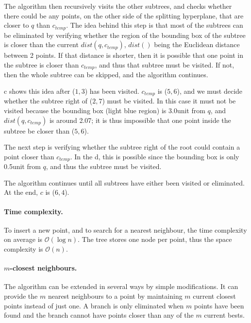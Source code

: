 The algorithm then recursively visits the other subtrees, and checks whether there could be any points, on the other side of the splitting hyperplane, that are closer to $q$ than $c_{temp}$.
The idea behind this step is that most of the subtrees can be eliminated by verifying whether the region of the bounding box of the subtree is closer than the current $dist(q, c_{temp})$, $dist()$ being the Euclidean distance between 2 points.
If that distance is shorter, then it is possible that one point in the subtree is closer than $c_{temp}$, and thus that subtree must be visited. 
If not, then the whole subtree can be skipped, and the algorithm continues.

c shows this idea after ($1,3$) has been visited.
$c_{temp}$ is ($5,6$), and we must decide whether the subtree right of ($2,7$) must be visited.
In this case it must not be visited because the bounding box (light blue region) is 3.0unit from $q$, and $dist(q,c_{temp})$ is around 2.07; it is thus impossible that one point inside the subtree be closer than ($5,6$).

The next step is verifying whether the subtree right of the root could contain a point closer than $c_{temp}$.
In the d, this is possible since the bounding box is only 0.5unit from $q$, and thus the subtree must be visited.

The algorithm continues until all subtrees have either been visited or eliminated.
At the end, $c$ is ($6,4$).


\paragraph{Time complexity.}
To insert a new point, and to search for a nearest neighbour, the time complexity on average is $\mathcal{O}(\log n)$.
The tree stores one node per point, thus the space complexity is $\mathcal{O}(n)$.

\paragraph{$m$-closest neighbours.}
The algorithm can be extended in several ways by simple modifications. 
It can provide the $m$ nearest neighbours to a point by maintaining $m$ current closest points instead of just one. 
A branch is only eliminated when $m$ points have been found and the branch cannot have points closer than any of the $m$ current bests. 



